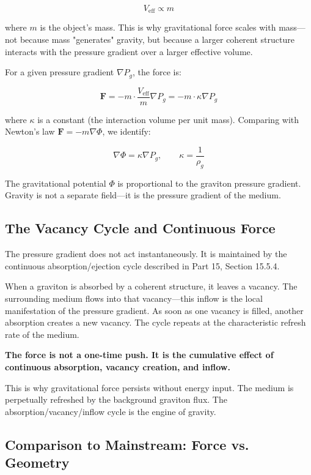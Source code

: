 \documentclass[12pt, a4paper]{article}
\begin{document}
\[
V_{\text{eff}} \propto m
\]

where \( m \) is the object's mass. This is why gravitational force scales with mass—not because mass "generates" gravity, but because a larger coherent structure interacts with the pressure gradient over a larger effective volume.

For a given pressure gradient \( \nabla P_g \), the force is:

\[
\mathbf{F} = -m \cdot \frac{V_{\text{eff}}}{m} \nabla P_g = -m \cdot \kappa \nabla P_g
\]

where \( \kappa \) is a constant (the interaction volume per unit mass). Comparing with Newton's law \( \mathbf{F} = -m \nabla \Phi \), we identify:

\[
\nabla \Phi = \kappa \nabla P_g, \qquad \kappa = \frac{1}{\rho_g}
\]

The gravitational potential \( \Phi \) is proportional to the graviton pressure gradient. Gravity is not a separate field—it is the pressure gradient of the medium.

\subsection{The Vacancy Cycle and Continuous Force}
\label{subsec:vacancy_cycle}

The pressure gradient does not act instantaneously. It is maintained by the continuous absorption/ejection cycle described in Part 15, Section 15.5.4.

When a graviton is absorbed by a coherent structure, it leaves a vacancy. The surrounding medium flows into that vacancy—this inflow is the local manifestation of the pressure gradient. As soon as one vacancy is filled, another absorption creates a new vacancy. The cycle repeats at the characteristic refresh rate of the medium.

\textbf{The force is not a one-time push. It is the cumulative effect of continuous absorption, vacancy creation, and inflow.}

This is why gravitational force persists without energy input. The medium is perpetually refreshed by the background graviton flux. The absorption/vacancy/inflow cycle is the engine of gravity.

\subsection{Comparison to Mainstream: Force vs. Geometry}
\label{subsec:force_vs_geometry}
\end{document}
